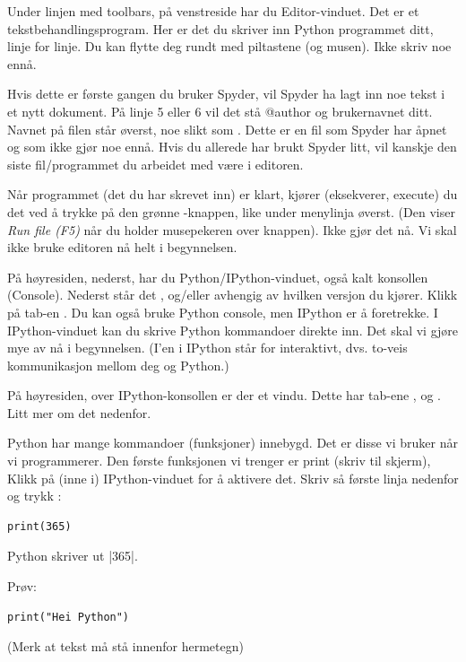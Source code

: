 Under linjen med toolbars, på venstreside har du Editor-vinduet. Det er et tekstbehandlingsprogram.  Her er det du skriver inn Python programmet ditt, linje for linje. Du kan flytte deg rundt med piltastene (og musen). Ikke skriv noe ennå. 

Hvis dette er første gangen du bruker Spyder, vil Spyder ha lagt inn noe tekst i et nytt dokument. På linje 5 eller 6 vil det stå @author og brukernavnet ditt. Navnet på filen står øverst, noe slikt som . Dette er en fil som Spyder har åpnet og som ikke gjør noe ennå. Hvis du allerede har brukt Spyder litt, vil kanskje den siste fil/programmet du arbeidet med være i editoren.

Når programmet (det du har skrevet inn) er klart, kjører (eksekverer, execute) du det ved å trykke på den grønne -knappen, like under menylinja øverst. (Den viser \emph{Run file (F5)} når du holder musepekeren over knappen). Ikke gjør det nå. Vi skal ikke bruke editoren nå helt i begynnelsen.

På høyresiden, nederst, har du Python/IPython-vinduet, også kalt konsollen (Console). Nederst står det ,  og/eller  avhengig av hvilken versjon du kjører. Klikk på tab-en . Du kan også bruke Python console, men IPython er å foretrekke. I IPython-vinduet kan du skrive Python kommandoer direkte inn. Det skal vi gjøre mye av nå i begynnelsen. (I'en i IPython står for interaktivt, dvs. to-veis kommunikasjon mellom deg og Python.)

På høyresiden, over IPython-konsollen er der et vindu. Dette har tab-ene ,  og . Litt mer om det nedenfor. 

Python har mange kommandoer (funksjoner) innebygd. Det er disse vi bruker når vi programmerer. Den første funksjonen vi trenger er print (skriv til skjerm), Klikk på (inne i) IPython-vinduet for å aktivere det. Skriv så første linja nedenfor og trykk  :
\begin{lstlisting}
print(365)
\end{lstlisting}
Python skriver ut \usnvarvalue|365|.

Prøv:
\begin{lstlisting}
print("Hei Python")
\end{lstlisting}

(Merk at tekst må stå innenfor hermetegn)

